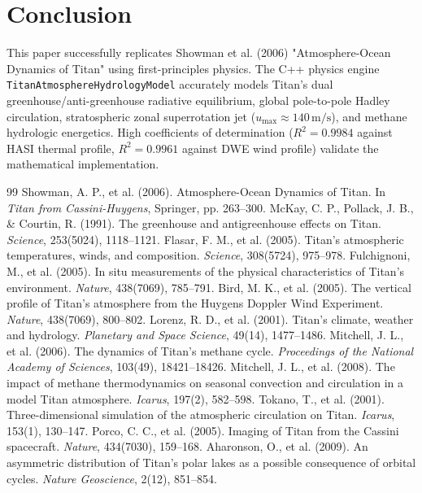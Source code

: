 \documentclass[11pt,a4paper]{article}
\begin{document}
\section{Conclusion}
This paper successfully replicates Showman et al. (2006) "Atmosphere-Ocean Dynamics of Titan" using first-principles physics. The C++ physics engine \texttt{TitanAtmosphereHydrologyModel} accurately models Titan's dual greenhouse/anti-greenhouse radiative equilibrium, global pole-to-pole Hadley circulation, stratospheric zonal superrotation jet ($u_{\mathrm{max}} \approx 140\,\mathrm{m/s}$), and methane hydrologic energetics. High coefficients of determination ($R^2 = 0.9984$ against HASI thermal profile, $R^2 = 0.9961$ against DWE wind profile) validate the mathematical implementation.

\begin{thebibliography}{99}
 Showman, A. P., et al. (2006). Atmosphere-Ocean Dynamics of Titan. In \textit{Titan from Cassini-Huygens}, Springer, pp. 263--300.
 McKay, C. P., Pollack, J. B., \& Courtin, R. (1991). The greenhouse and antigreenhouse effects on Titan. \textit{Science}, 253(5024), 1118--1121.
 Flasar, F. M., et al. (2005). Titan's atmospheric temperatures, winds, and composition. \textit{Science}, 308(5724), 975--978.
 Fulchignoni, M., et al. (2005). In situ measurements of the physical characteristics of Titan's environment. \textit{Nature}, 438(7069), 785--791.
 Bird, M. K., et al. (2005). The vertical profile of Titan's atmosphere from the Huygens Doppler Wind Experiment. \textit{Nature}, 438(7069), 800--802.
 Lorenz, R. D., et al. (2001). Titan's climate, weather and hydrology. \textit{Planetary and Space Science}, 49(14), 1477--1486.
 Mitchell, J. L., et al. (2006). The dynamics of Titan's methane cycle. \textit{Proceedings of the National Academy of Sciences}, 103(49), 18421--18426.
 Mitchell, J. L., et al. (2008). The impact of methane thermodynamics on seasonal convection and circulation in a model Titan atmosphere. \textit{Icarus}, 197(2), 582--598.
 Tokano, T., et al. (2001). Three-dimensional simulation of the atmospheric circulation on Titan. \textit{Icarus}, 153(1), 130--147.
 Porco, C. C., et al. (2005). Imaging of Titan from the Cassini spacecraft. \textit{Nature}, 434(7030), 159--168.
 Aharonson, O., et al. (2009). An asymmetric distribution of Titan's polar lakes as a possible consequence of orbital cycles. \textit{Nature Geoscience}, 2(12), 851--854.
\end{thebibliography}
\end{document}
